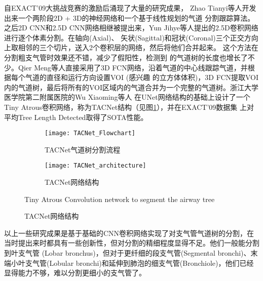 	自EXACT'09大挑战竞赛的激励后涌现了大量的研究成果， Zhao Tianyi等人\cite{Zhao2019BronchusSA}开发出来一个两阶段2D + 3D的神经网络和一个基于线性规划的气道
	分割跟踪算法。之后2D CNN和2.5D CNN网络相继被提出来，Yun Jihye等人\cite{YUN201913}提出的2.5D卷积网络进行逐个体素分割。在轴向(Axial)、
	矢状(Sagittal)和冠状(Coronal)三个正交方向上取相邻的三个切片，送入2个卷积层的网络，然后将他们合并起来。 这个方法在分割粗支气管时效果还不错，减少了假阳性，检测到
	的气道树的长度也增长了不少。Qier Meng等人\cite{Meng2017TrackingAS}直接采用了3D FCN网络，沿着气道的中心线跟踪气道，并根据每个气道的直径和运行方向设置VOI
	(感兴趣	的立方体体积)，3D FCN提取VOI内的气道树，最后将所有的VOI区域内的气道合并为一个完整的气道树。浙江大学医学院第二附属医院的Wu Xiaoming等人
	\cite{Wu2021TACNet}在UNet网络结构的基础上设计了一个Tiny Atrous卷积网络，称为TACNet\cite{Wu2021TACNet}结构（见图\ref{fig:TACNet}），并在EXACT'09数据集
	上对平均Tree Length Detected取得了SOTA性能。
	\begin{figure}[!htp]
		\centering
		\begin{subfigure}{0.39\textwidth}
			\centering
			\texttt{[image: TACNet\_Flowchart]}
			\caption{TACNet气道树分割流程}
		\end{subfigure}
		\hfill
		\begin{subfigure}{0.6\textwidth}
			\centering
			\texttt{[image: TACNet\_architecture]}
			\caption{TACNet网络结构}
		\end{subfigure}
			{Tiny Atrous Convolution network to segment the airway tree}
		\label{fig:TACNet}
	\end{figure}
	
	以上一些研究成果是基于基础的CNN卷积网络实现了对支气管气道树的分割，在当时提出来时都具有一些创新性，但对分割的精细程度显得不足。他们一般能分割到叶支气管
	(Lobar bronchus)，但对于更纤细的段支气管(Segmental bronchi)、末端小叶支气管(Lobular bronchi)和延伸到肺泡的细支气管(Bronchiole)，他们已经显得能力不够，难以分割更细小的支气管了。
	
